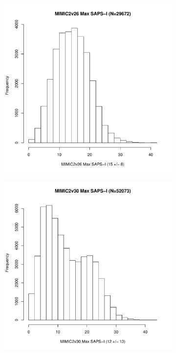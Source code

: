 \documentclass[10pt]{article}
\begin{document}
\begin{figure}
        \begin{subfigure}[b]{0.5\textwidth}
                \includegraphics[width=\linewidth]{../../figure/fig_hist_sapsi_max_mimic2v26.pdf}
        \end{subfigure}%
        \begin{subfigure}[b]{0.5\textwidth}
                \includegraphics[width=\linewidth]{../../figure/fig_hist_sapsi_max_mimic2v30.pdf}   
        \end{subfigure}
\end{figure}
\end{document}
